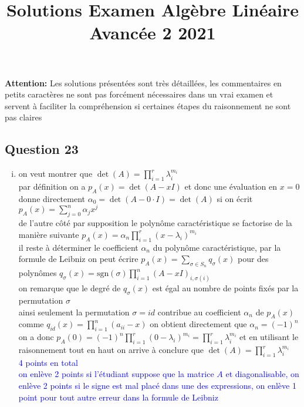 \documentclass[11pt, a4paper, oneside]{article}
\newcommand{\indice}[1]{{\scriptsize \color{RubineRed} {#1}}}
\begin{document}
\title{Solutions Examen Algèbre Linéaire Avancée 2 2021}
\maketitle

\noindent 
\textbf{Attention:} Les solutions présentées sont très détaillées, les commentaires en \indice{ petits caractères} ne sont pas forcément nécessaires dans un vrai examen et servent à faciliter la compréhension si certaines étapes du raisonnement ne sont pas claires

\subsection*{Question 23}
\begin{enumerate}[i)] 
\item 
on veut montrer que $\det(A) = \prod_{i=1}^r \lambda_i^{m_i}$ \\
{\tiny par définition on a $p_A(x) = \det(A-xI)$ et donc une évaluation en $x=0$} donne directement $\alpha_0 = \det(A-0\cdot I) = \det(A)$ si on écrit $p_A(x) = \sum_{j=0}^n \alpha_jx^j$ \\
{\tiny de l'autre côté par supposition} le polynôme caractéristique se factorise de la manière suivante $p_A(x) = \alpha_n \prod_{i=1}^r (x-\lambda_i)^{m_i}$ \\
il reste à déterminer le coefficient $\alpha_n$ du polynôme caractéristique, par la formule de Leibniz on peut écrire $p_A(x) = \sum_{\sigma \in S_n} q_{\sigma}(x)$ pour des polynômes $q_{\sigma}(x) = \text{sgn}(\sigma)\prod_{i=1}^n(A-xI)_{i,\sigma(i)}$ \\
on remarque que le degré de $q_{\sigma}(x)$ est égal au nombre de points fixés par la permutation $\sigma$ \\
ainsi seulement la permutation $\sigma = id$ contribue au coefficient $\alpha_n$ de $p_A(x)$ \\
comme $q_{id}(x) = \prod_{i=1}^n(a_{ii}-x)$ on obtient directement que $\alpha_n = (-1)^n$ \\
on a donc $p_A(0) = (-1)^n \prod_{i=1}^r (0-\lambda_i)^{m_i} = \prod_{i=1}^r \lambda_i^{m_i}$ et {\tiny en utilisant le raisonnement tout en haut} on arrive à conclure que $\det(A) = \prod_{i=1}^r \lambda_i^{m_i}$ \\ \textcolor{blue}{4 points en total \\ on enlève 2 points si l'étudiant suppose que la matrice $A$ et diagonalisable, on enlève 2 points si le signe est mal placé dans une des expressions, on enlève 1 point pour tout autre erreur dans la formule de Leibniz}


\end{enumerate}
\end{document}

